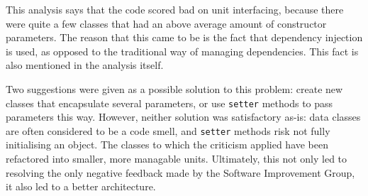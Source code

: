 This analysis says that the code scored bad on unit interfacing, because there
were quite a few classes that had an above average amount of constructor
parameters. The reason that this came to be is the fact that dependency
injection is used, as opposed to the traditional way of managing dependencies.
This fact is also mentioned in the analysis itself.

Two suggestions were given as a possible solution to this problem: create new
classes that encapsulate several parameters, or use \texttt{setter} methods
to pass parameters this way. However, neither solution was satisfactory as-is:
data classes are often considered to be a code smell, and \texttt{setter}
methods risk not fully initialising an object. The classes to which the
criticism applied have been refactored into smaller, more managable units.
Ultimately, this not only led to resolving the only negative feedback made by
the Software Improvement Group, it also led to a better architecture.

